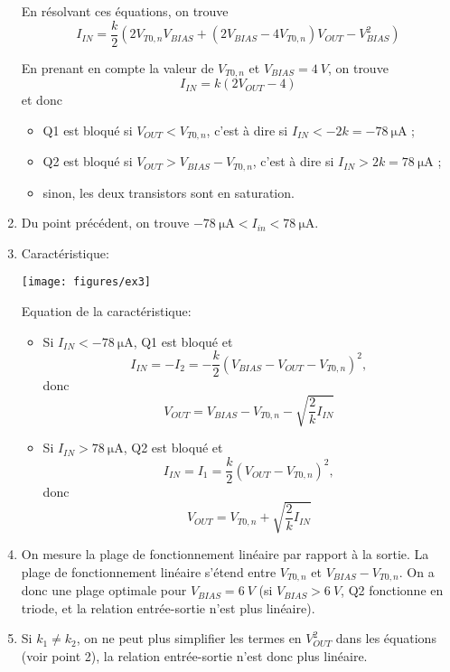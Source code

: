 \documentclass[frenchb,DIV=13]{scrartcl}
\begin{document}
\begin{enumerate}
	En résolvant ces équations, on trouve
	\[I_{IN} = \frac{k}{2}\left(2 V_{T0,n} V_{BIAS} + (2 V_{BIAS} - 4 V_{T0,n}) V_{OUT} - V_{BIAS}
	^2\right)\]

	En prenant en compte la valeur de $V_{T0,n}$ et $V_{BIAS} = \SI{4}{V}$, on trouve
	\[I_{IN} = k\left(2 V_{OUT} - 4\right)\]
	et donc
	\begin{itemize}
		\item Q1 est bloqué si $V_{OUT} < V_{T0,n}$, c'est à dire si
		$I_{IN} < -2k = -\SI{78}{\micro\ampere}$ ;
		\item Q2 est bloqué si $V_{OUT} > V_{BIAS} - V_{T0,n}$, c'est à dire si
		$I_{IN} > 2k = \SI{78}{\micro\ampere}$ ;
		\item sinon, les deux transistors sont en saturation.
	\end{itemize}

	\item Du point précédent, on trouve $-\SI{78}{\micro\ampere} < I_{in} < \SI{78}{\micro\ampere}$.

	\item Caractéristique:
	\begin{center}
		\texttt{[image: figures/ex3]}
	\end{center}

	Equation de la caractéristique:
	\begin{itemize}
    	\item Si $I_{IN} < \SI{-78}{\micro\ampere}$, Q1 est bloqué et
        \[I_{IN} = - I_2 = -\frac{k}{2}\left(V_{BIAS} - V_{OUT} - V_{T0,n}\right)^2,\]
        donc \[V_{OUT} = V_{BIAS} - V_{T0,n} - \sqrt{\frac{2}{k}I_{IN}}\]
    	\item Si $I_{IN} > \SI{78}{\micro\ampere}$, Q2 est bloqué et
        \[I_{IN} = I_1 = \frac{k}{2}\left(V_{OUT} - V_{T0,n}\right)^2,\]
        donc \[V_{OUT} = V_{T0,n} + \sqrt{\frac{2}{k}I_{IN}}\]
	\end{itemize}
	
	\item On mesure la plage de fonctionnement linéaire par rapport à la sortie. La plage de
	fonctionnement linéaire s'étend entre $V_{T0,n}$ et $V_{BIAS} - V_{T0,n}$. On a donc une plage
	optimale pour $V_{BIAS} = \SI{6}{V}$ (si $V_{BIAS} > \SI{6}{V}$, Q2 fonctionne en triode, et la
	relation entrée-sortie n'est plus linéaire).

	\item Si $k_1 \neq k_2$, on ne peut plus simplifier les termes en $V_{OUT}^2$ dans les équations
	(voir point 2), la relation entrée-sortie n'est donc plus linéaire.
\end{enumerate}

\end{document}
